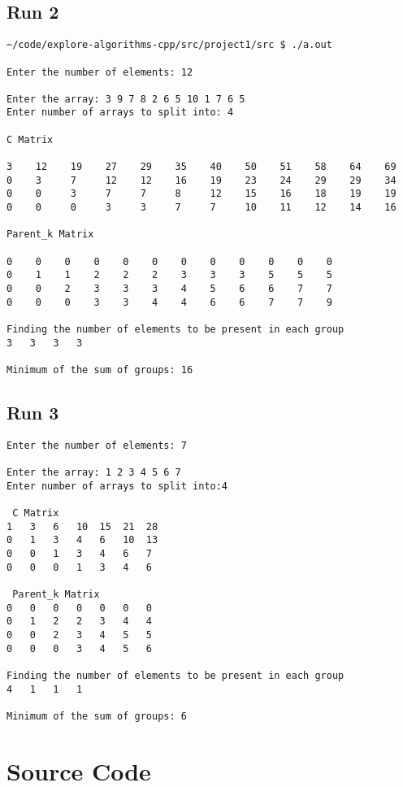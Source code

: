 \documentclass{article}
\begin{document}
\subsection{Run 2}
\begin{verbatim}
~/code/explore-algorithms-cpp/src/project1/src $ ./a.out 

Enter the number of elements: 12

Enter the array: 3 9 7 8 2 6 5 10 1 7 6 5
Enter number of arrays to split into: 4

C Matrix

3    12    19    27    29    35    40    50    51    58    64    69    
0    3     7     12    12    16    19    23    24    29    29    34    
0    0     3     7     7     8     12    15    16    18    19    19    
0    0     0     3     3     7     7     10    11    12    14    16    

Parent_k Matrix

0    0    0    0    0    0    0    0    0    0    0    0    
0    1    1    2    2    2    3    3    3    5    5    5    
0    0    2    3    3    3    4    5    6    6    7    7    
0    0    0    3    3    4    4    6    6    7    7    9    

Finding the number of elements to be present in each group
3	3	3	3

Minimum of the sum of groups: 16
\end{verbatim}

\pagebreak

\subsection{Run 3}
\begin{verbatim}
Enter the number of elements: 7

Enter the array: 1 2 3 4 5 6 7
Enter number of arrays to split into:4

 C Matrix 
1	3	6	10	15	21	28	
0	1	3	4	6	10	13	
0	0	1	3	4	6	7	
0	0	0	1	3	4	6	

 Parent_k Matrix 
0	0	0	0	0	0	0	
0	1	2	2	3	4	4	
0	0	2	3	4	5	5	
0	0	0	3	4	5	6	

Finding the number of elements to be present in each group
4	1	1	1

Minimum of the sum of groups: 6
\end{verbatim}

\section{Source Code}
\end{document}
